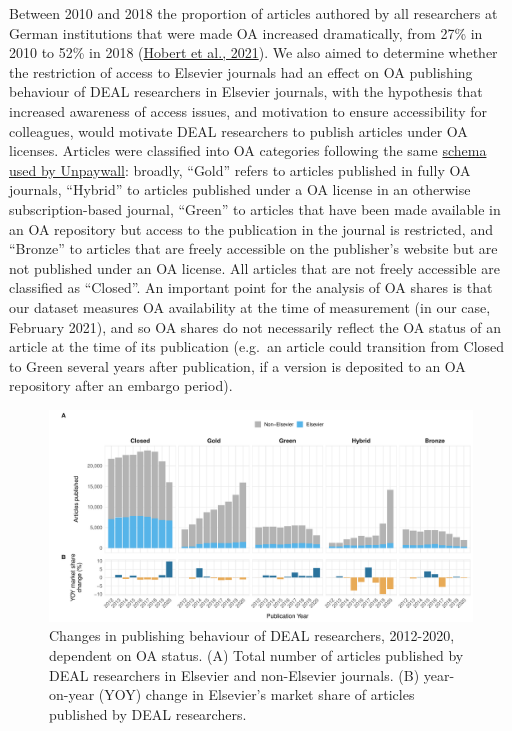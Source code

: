 \documentclass[
]{article}
\begin{document}
Between 2010 and 2018 the proportion of articles authored by all researchers at German institutions that were made OA increased dramatically, from 27\% in 2010 to 52\% in 2018 (\href{https://doi.org/10.1007/s11192-021-04002-0}{Hobert et al., 2021}). We also aimed to determine whether the restriction of access to Elsevier journals had an effect on OA publishing behaviour of DEAL researchers in Elsevier journals, with the hypothesis that increased awareness of access issues, and motivation to ensure accessibility for colleagues, would motivate DEAL researchers to publish articles under OA licenses. Articles were classified into OA categories following the same \href{https://support.unpaywall.org/support/solutions/articles/44001777288-what-do-the-types-of-oa-status-green-gold-hybrid-and-bronze-mean-}{schema used by Unpaywall}: broadly, ``Gold'' refers to articles published in fully OA journals, ``Hybrid'' to articles published under a OA license in an otherwise subscription-based journal, ``Green'' to articles that have been made available in an OA repository but access to the publication in the journal is restricted, and ``Bronze'' to articles that are freely accessible on the publisher's website but are not published under an OA license. All articles that are not freely accessible are classified as ``Closed''. An important point for the analysis of OA shares is that our dataset measures OA availability at the time of measurement (in our case, February 2021), and so OA shares do not necessarily reflect the OA status of an article at the time of its publication (e.g.~an article could transition from Closed to Green several years after publication, if a version is deposited to an OA repository after an embargo period).

\begin{figure}

{\centering \includegraphics{analysis_files/figure-latex/items-publisher-year-oa-1} 

}

\caption{Changes in publishing behaviour of DEAL researchers, 2012-2020, dependent on OA status. (A) Total number of articles published by DEAL researchers in Elsevier and non-Elsevier journals. (B) year-on-year (YOY) change in Elsevier's market share of articles published by DEAL researchers.}\label{fig:items-publisher-year-oa}
\end{figure}
\end{document}
